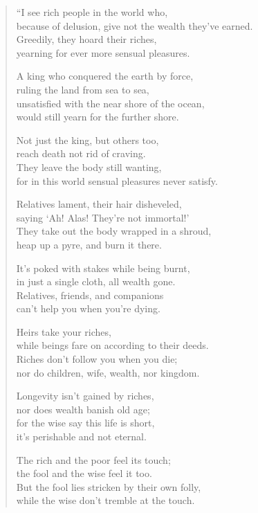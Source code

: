 \documentclass[12pt,openany]{book}%
\begin{document}
\begin{verse}%
“I see rich people in the world who, \\
because of delusion, give not the wealth they’ve earned. \\
Greedily, they hoard their riches, \\
yearning for ever more sensual pleasures. 

A king who conquered the earth by force, \\
ruling the land from sea to sea, \\
unsatisfied with the near shore of the ocean, \\
would still yearn for the further shore. 

Not just the king, but others too, \\
reach death not rid of craving. \\
They leave the body still wanting, \\
for in this world sensual pleasures never satisfy. 

Relatives lament, their hair disheveled, \\
saying ‘Ah! Alas! They’re not immortal!’ \\
They take out the body wrapped in a shroud, \\
heap up a pyre, and burn it there. 

It’s poked with stakes while being burnt, \\
in just a single cloth, all wealth gone. \\
Relatives, friends, and companions \\
can’t help you when you’re dying. 

Heirs take your riches, \\
while beings fare on according to their deeds. \\
Riches don’t follow you when you die; \\
nor do children, wife, wealth, nor kingdom. 

Longevity isn’t gained by riches, \\
nor does wealth banish old age; \\
for the wise say this life is short, \\
it’s perishable and not eternal. 

The rich and the poor feel its touch; \\
the fool and the wise feel it too. \\
But the fool lies stricken by their own folly, \\
while the wise don’t tremble at the touch. 


\end{verse}
\end{document}
